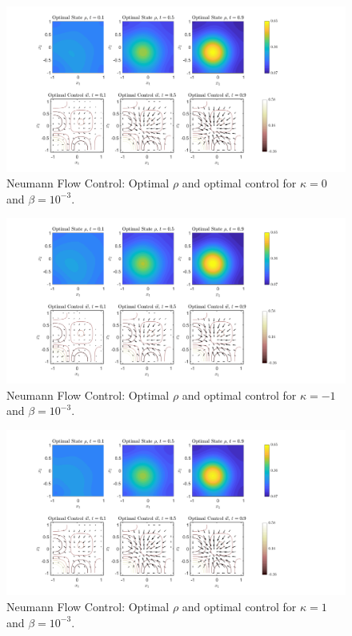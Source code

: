 \documentclass[11pt, a4paper]{article}
\theoremstyle{definition}
\begin{document}
	\begin{figure}[h]
		\centering
		\includegraphics[scale=0.35]{FCNk0.png}
		\caption{Neumann Flow Control: Optimal $\rho$ and optimal control for $\kappa = 0$ and $\beta = 10^{-3}$.} 
		\label{F3a}
	\end{figure}
	\begin{figure}[h]
		\centering
		\includegraphics[scale=0.35]{FCNkn1.png}
		\caption{Neumann Flow Control: Optimal $\rho$ and optimal control for $\kappa = -1$ and $\beta = 10^{-3}$.} 
		\label{F3b}
	\end{figure}
	\begin{figure}[h]
		\centering
		\includegraphics[scale=0.35]{FCNk1.png}
		\caption{Neumann Flow Control: Optimal $\rho$ and optimal control for $\kappa = 1$ and $\beta = 10^{-3}$.} 
		\label{F3c}
	\end{figure}
	
\end{document}
